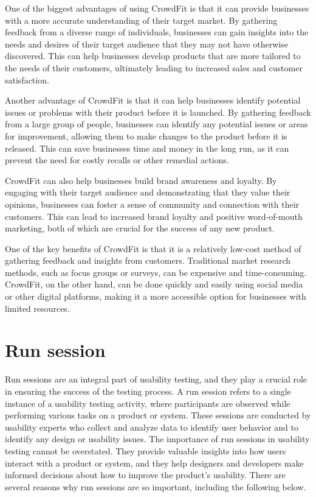 One of the biggest advantages of using CrowdFit is that it can provide businesses with a more accurate understanding of their 
target market. By gathering feedback from a diverse range of individuals, businesses can gain insights into the needs and desires 
of their target audience that they may not have otherwise discovered. This can help businesses develop products that are more 
tailored to the needs of their customers, ultimately leading to increased sales and customer satisfaction.

Another advantage of CrowdFit is that it can help businesses identify potential issues or problems with their product before it 
is launched. By gathering feedback from a large group of people, businesses can identify any potential issues or areas for improvement, 
allowing them to make changes to the product before it is released. This can save businesses time and money in the long run, as it can 
prevent the need for costly recalls or other remedial actions.

CrowdFit can also help businesses build brand awareness and loyalty. By engaging with their target audience and demonstrating that they 
value their opinions, businesses can foster a sense of community and connection with their customers. This can lead to increased brand 
loyalty and positive word-of-mouth marketing, both of which are crucial for the success of any new product.

One of the key benefits of CrowdFit is that it is a relatively low-cost method of gathering feedback and insights from customers. 
Traditional market research methods, such as focus groups or surveys, can be expensive and time-consuming. CrowdFit, on the other hand, 
can be done quickly and easily using social media or other digital platforms, making it a more accessible option for businesses with limited resources.

\section{Run session}
Run sessions are an integral part of usability testing, and they play a crucial role in ensuring the success of the testing process. 
A run session refers to a single instance of a usability testing activity, where participants are observed while performing various 
tasks on a product or system. These sessions are conducted by usability experts who collect and analyze data to identify user behavior 
and to identify any design or usability issues.
The importance of run sessions in usability testing cannot be overstated. They provide valuable insights into how users interact with a 
product or system, and they help designers and developers make informed decisions about how to improve the product's usability. 
There are several reasons why run sessions are so important, including the following below.

